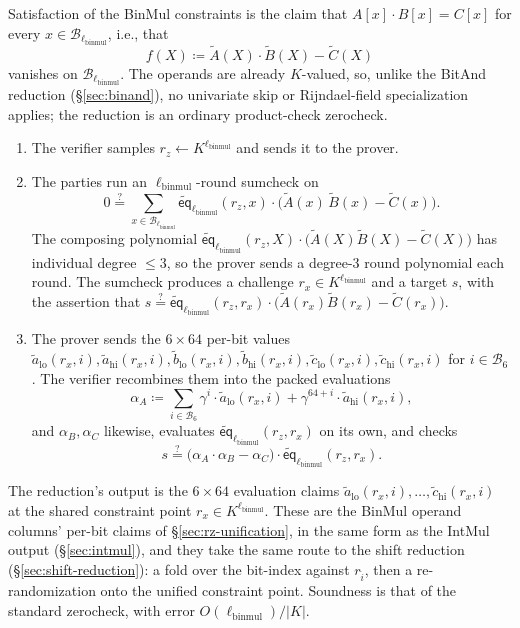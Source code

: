 \documentclass{article}
\theoremstyle{definition}
\newcommand*{\mle}{\widetilde}
\newcommand{\eq}{\mathsf{eq}}
\newcommand{\BB}{\mathcal{B}}
\begin{document}
Satisfaction of the BinMul constraints is the claim that $A[x] \cdot B[x] = C[x]$ for every $x \in \BB_{\ell_\text{binmul}}$, i.e., that
\[
  f(X) \coloneqq \mle{A}(X) \cdot \mle{B}(X) - \mle{C}(X)
\]
vanishes on $\BB_{\ell_\text{binmul}}$. The operands are already $K$-valued, so, unlike the BitAnd reduction (\S\ref{sec:binand}), no univariate skip or Rijndael-field specialization applies; the reduction is an ordinary product-check zerocheck.
\begin{enumerate}
\item The verifier samples $r_z \gets K^{\ell_\text{binmul}}$ and sends it to the prover.
\item The parties run an $\ell_\text{binmul}$-round sumcheck on
  \[
    0 \stackrel{?}{=} \sum_{x \in \BB_{\ell_\text{binmul}}} \mle{\eq}_{\ell_\text{binmul}}(r_z, x) \cdot \bigl( \mle{A}(x) \, \mle{B}(x) - \mle{C}(x) \bigr).
  \]
  The composing polynomial $\mle{\eq}_{\ell_\text{binmul}}(r_z, X) \cdot \bigl( \mle{A}(X) \mle{B}(X) - \mle{C}(X) \bigr)$ has individual degree $\leq 3$, so the prover sends a degree-$3$ round polynomial each round. The sumcheck produces a challenge $r_x \in K^{\ell_\text{binmul}}$ and a target $s$, with the assertion that $s \stackrel{?}{=} \mle{\eq}_{\ell_\text{binmul}}(r_z, r_x) \cdot \bigl( \mle{A}(r_x) \mle{B}(r_x) - \mle{C}(r_x) \bigr)$.
\item The prover sends the $6 \times 64$ per-bit values $\mle{a}_\text{lo}(r_x, i), \mle{a}_\text{hi}(r_x, i), \mle{b}_\text{lo}(r_x, i), \mle{b}_\text{hi}(r_x, i), \mle{c}_\text{lo}(r_x, i), \mle{c}_\text{hi}(r_x, i)$ for $i \in \BB_6$. The verifier recombines them into the packed evaluations
  \[
    \alpha_A \coloneqq \sum_{i \in \BB_6} \gamma^i \cdot \mle{a}_\text{lo}(r_x, i) + \gamma^{64 + i} \cdot \mle{a}_\text{hi}(r_x, i),
  \]
  and $\alpha_B, \alpha_C$ likewise, evaluates $\mle{\eq}_{\ell_\text{binmul}}(r_z, r_x)$ on its own, and checks
  \[
    s \stackrel{?}{=} \bigl( \alpha_A \cdot \alpha_B - \alpha_C \bigr) \cdot \mle{\eq}_{\ell_\text{binmul}}(r_z, r_x).
  \]
\end{enumerate}

The reduction's output is the $6 \times 64$ evaluation claims $\mle{a}_\text{lo}(r_x, i), \ldots, \mle{c}_\text{hi}(r_x, i)$ at the shared constraint point $r_x \in K^{\ell_\text{binmul}}$. These are the BinMul operand columns' per-bit claims of \S\ref{sec:rz-unification}, in the same form as the IntMul output (\S\ref{sec:intmul}), and they take the same route to the shift reduction (\S\ref{sec:shift-reduction}): a fold over the bit-index against $r_{\widehat{i}}$, then a re-randomization onto the unified constraint point. Soundness is that of the standard zerocheck, with error $O(\ell_\text{binmul}) / |K|$.
\end{document}
